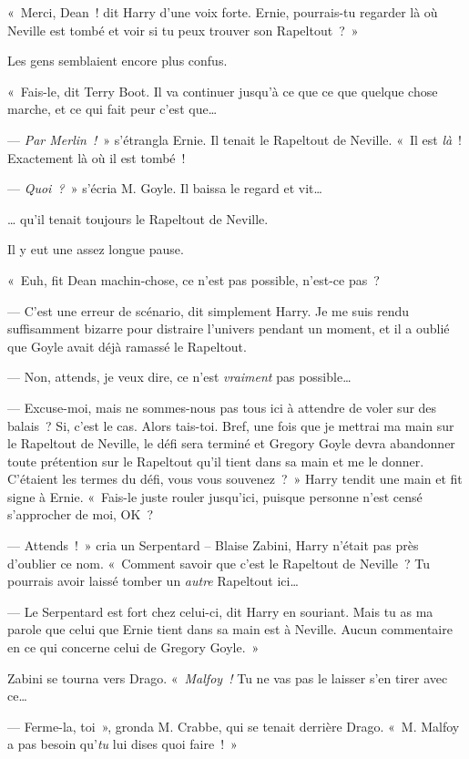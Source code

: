 «~Merci, Dean~! dit Harry d'une voix forte.
Ernie, pourrais-tu regarder là où Neville est tombé et voir si tu peux trouver son Rapeltout~?~»

Les gens semblaient encore plus confus.

«~Fais-le, dit Terry Boot. Il va continuer jusqu'à ce que ce que quelque chose marche, et ce qui fait peur c'est que…

--- \emph{Par Merlin~!}~» s'étrangla Ernie.
Il tenait le Rapeltout de Neville.
«~Il est \emph{là}~! Exactement là où il est tombé~!

--- \emph{Quoi~?}~» s'écria M. Goyle. Il baissa le regard et vit…

… qu'il tenait toujours le Rapeltout de Neville.

Il y eut une assez longue pause.

«~Euh, fit Dean machin-chose, ce n'est pas possible, n'est-ce pas~?

--- C'est une erreur de scénario, dit simplement Harry.
Je me suis rendu suffisamment bizarre pour distraire l'univers pendant un moment, et il a oublié que Goyle avait déjà ramassé le Rapeltout.

--- Non, attends, je veux dire, ce n'est \emph{vraiment} pas possible…

--- Excuse-moi, mais ne sommes-nous pas tous ici à attendre de voler sur des balais~?
Si, c'est le cas. Alors tais-toi.
Bref, une fois que je mettrai ma main sur le Rapeltout de Neville, le défi sera terminé et Gregory Goyle devra abandonner toute prétention sur le Rapeltout qu'il tient dans sa main et me le donner.
C'étaient les termes du défi, vous vous souvenez~?~»
Harry tendit une main et fit signe à Ernie.
«~Fais-le juste rouler jusqu'ici, puisque personne n'est censé s'approcher de moi, OK~?

--- Attends~!~» cria un Serpentard -- Blaise Zabini, Harry n'était pas près d'oublier ce nom.
«~Comment savoir que c'est le Rapeltout de Neville~?
Tu pourrais avoir laissé tomber un \emph{autre} Rapeltout ici…

--- Le Serpentard est fort chez celui-ci, dit Harry en souriant.
Mais tu as ma parole que celui que Ernie tient dans sa main est à Neville.
Aucun commentaire en ce qui concerne celui de Gregory Goyle.~»

Zabini se tourna vers Drago.
«~\emph{Malfoy~!} Tu ne vas pas le laisser s'en tirer avec ce…

--- Ferme-la, toi~», gronda M. Crabbe, qui se tenait derrière Drago.
«~M. Malfoy a pas besoin qu'\emph{tu} lui dises quoi faire~!~»

